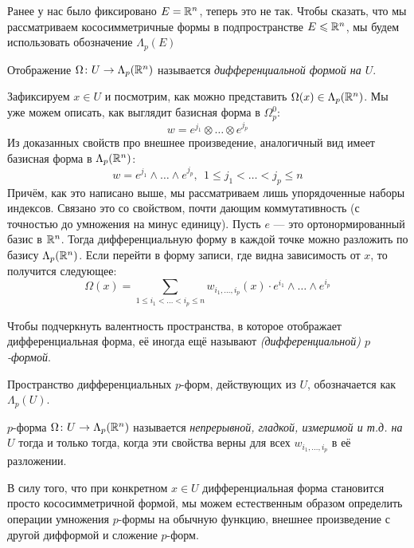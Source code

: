 \begin{note}
	Ранее у нас было фиксировано $E = \mathbb{R}^n$, теперь это не так. Чтобы сказать, что мы рассматриваем кососимметричные формы в подпространстве $E \leqslant \mathbb{R}^n$, мы будем использовать обозначение $\Lambda_p(E)$
\end{note}

\begin{definition}
	Отображение $\Omega \colon U \to \Lambda_p(\mathbb{R}^n)$ называется \textit{дифференциальной формой на $U$}.
\end{definition}

\begin{note}
	Зафиксируем $x \in U$ и посмотрим, как можно представить $\Omega(x) \in \Lambda_p(\mathbb{R}^n)$. Мы уже можем описать, как выглядит базисная форма в $\Omega_p^0$:
	\[
		w = e^{j_1} \otimes \ldots \otimes e^{j_p}
	\]
	Из доказанных свойств про внешнее произведение, аналогичный вид имеет базисная форма в $\Lambda_p(\mathbb{R}^n)$:
	\[
		w = e^{j_1} \wedge \ldots \wedge e^{j_p},\ \ 1 \le j_1 < \ldots < j_p \le n
	\]
	Причём, как это написано выше, мы рассматриваем лишь упорядоченные наборы индексов. Связано это со свойством, почти дающим коммутативность (с точностью до умножения на минус единицу). Пусть $e$ --- это ортонормированный базис в $\mathbb{R}^n$. Тогда дифференциальную форму в каждой точке можно разложить по базису $\Lambda_p(\mathbb{R}^n)$. Если перейти в форму записи, где видна зависимость от $x$, то получится следующее:
	\[
		\Omega(x) = \sum_{1 \le i_1 < \ldots < i_p \le n} w_{i_1, \ldots, i_p}(x) \cdot e^{i_1} \wedge \ldots \wedge e^{i_p}
	\]
\end{note}

\begin{note}
	Чтобы подчеркнуть валентность пространства, в которое отображает дифференциальная форма, её иногда ещё называют \textit{(дифференциальной) $p$-формой}.
\end{note}

\begin{note}
	Пространство дифференциальных $p$-форм, действующих из $U$, обозначается как $\Lambda_p(U)$.
\end{note}

\begin{definition}
	$p$-форма $\Omega \colon U \to \Lambda_p(\mathbb{R}^n)$ называется \textit{непрерывной, гладкой, измеримой и т.д. на $U$} тогда и только тогда, когда эти свойства верны для всех $w_{i_1, \ldots, i_p}$ в её разложении.
\end{definition}

\begin{note}
	В силу того, что при конкретном $x \in U$ дифференциальная форма становится просто кососимметричной формой, мы можем естественным образом определить операции умножения $p$-формы на обычную функцию, внешнее произведение с другой дифформой и сложение $p$-форм.
\end{note}

